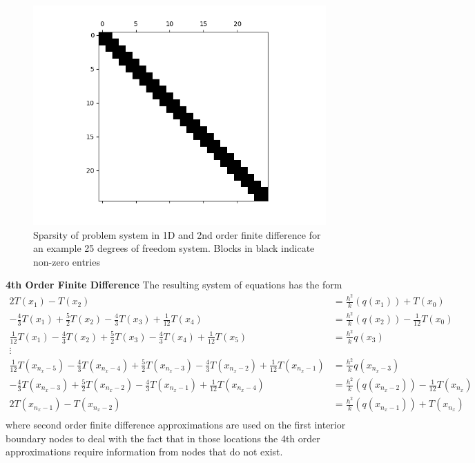 \documentclass[letterpaper,12pt]{article}
\begin{document}
\begin{figure}[h]
\centering
\includegraphics[width=.9 \textwidth]{oned_sparse_2.png}
\caption{Sparsity of problem system in 1D and 2nd order finite difference for an example 25 degrees of freedom system. Blocks in black indicate non-zero entries}
\label{1D2ndSparse}
\end{figure} 

\textbf{4th Order Finite Difference} The resulting system of equations has the form
\begin{align}
\label{1D4FDsys}
2 T(x_1) - T(x_2) &= \frac{h^2}{k} (q(x_1)) + T(x_0) \nonumber \\
 - \frac{4}{3} T(x_{1}) +\frac{5}{2} T(x_2) -\frac{4}{3} T(x_{3})  + \frac{1}{12} T(x_4) &= \frac{h^2}{k} (q(x_2)) - \frac{1}{12} T(x_0) \nonumber \\
\frac{1}{12} T(x_1) -\frac{4}{3} T(x_{2}) +\frac{5}{2} T(x_3) - \frac{4}{3} T(x_{4}) + \frac{1}{12} T(x_5) &= \frac{h^2}{k} q(x_3) \nonumber \\
\vdots \\
\frac{1}{12} T(x_{n_x - 5}) -\frac{4}{3} T(x_{n_x - 4}) +\frac{5}{2} T(x_{n_x - 3}) - \frac{4}{3} T(x_{n_x - 2}) + \frac{1}{12} T(x_{n_x - 1}) &= \frac{h^2}{k} q(x_{n_x - 3}) \nonumber \\
-\frac{4}{3} T(x_{n_x - 3}) +\frac{5}{2} T(x_{n_x - 2}) - \frac{4}{3} T(x_{n_x - 1}) + \frac{1}{12} T(x_{n_x - 4}) &= \frac{h^2}{k} (q(x_{n_x - 2})) - \frac{1}{12} T(x_{n_x}) \nonumber \\
2 T(x_{n_x - 1}) - T(x_{n_x - 2}) &= \frac{h^2}{k} (q(x_{n_x - 1})) + T(x_{n_x}) \nonumber \\ \nonumber
\end{align}
where second order finite difference approximations are used on the first interior boundary nodes to deal with the fact that in those locations the 4th order approximations require information from nodes that do not exist. 
\end{document}
